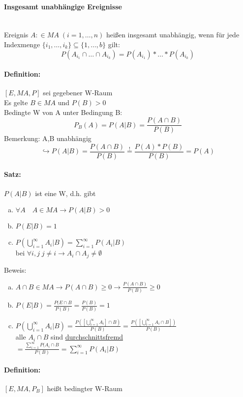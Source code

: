 \documentclass[a4paper,12pt]{scrartcl}
\begin{document}
\paragraph{Insgesamt unabhängige Ereignisse}\quad\\
Ereignis $A: \in MA \;(i=1,\dots,n)$ heißen insgesamt unabhängig, wenn für jede Indexmenge $\{i_1,\dots,i_k\}\subseteq \{1,\dots,b\}$ gilt: 
$$P(A_{i_1}\cap\dots\cap A_{i_k})=P(A_{i_1})*\dots *P(A_{i_k})$$
\paragraph{Definition:} $[E,MA,P]$ sei gegebener W-Raum\\
Es gelte $B\in MA$ und $P(B)>0$\\
Bedingte W von A unter Bedingung B:\\
$$P_B(A) = P(A|B) = \frac{P(A\cap B)}{P(B)}$$
Bemerkung: A,B unabhängig
$$\hookrightarrow P(A|B)=\frac{P(A\cap B)}{P(B)}\overset{!}{=}\frac{P(A)*P(B)}{P(B)}=P(A)$$
\paragraph{Satz:} $P(A|B)$ ist eine W, d.h. gibt
\begin{enumerate}[(a)]
 \item $\forall A\quad A\in MA \rightarrow P(A|B)>0$
 \item $P(E|B) = 1$
 \item $P(\bigcup^{\infty}_{i=1}A_i|B) = \sum_{i=1}^\infty P(A_i|B)$\\
	bei $\forall i,j \; j\neq i\rightarrow A_i \cap A_j \neq \emptyset $
\end{enumerate}

Beweis:
\begin{enumerate}[(a)]
 \item $A\cap B \in MA \rightarrow P(A\cap B)\geq 0 \rightarrow \frac{P(A\cap B)}{P(B)} \geq 0 $
 \item $P(E|B) = \frac{P(E\cap B}{P(B)} = \frac{P(B)}{P(B)} = 1$
 \item $P(\bigcup^{\infty}_{i=1}A_i|B) = \frac{P([\bigcup^{\infty}_{i=1}A_i]\cap B)}{P(B)} = \frac{P([\bigcup^{\infty}_{i=1}A_i\cap B])}{P(B)}$\\ alle $A_i\cap B$ sind \underline{durchschnittsfremd}\\
 $=\frac{\sum^\infty_{i=1}P(A_i\cap B}{P(B)} = \sum^\infty_{i=1}P(A_i|B)$
\end{enumerate}

\paragraph{Definition:} $[E,MA,P_B]$ heißt bedingter W-Raum
\end{document}
